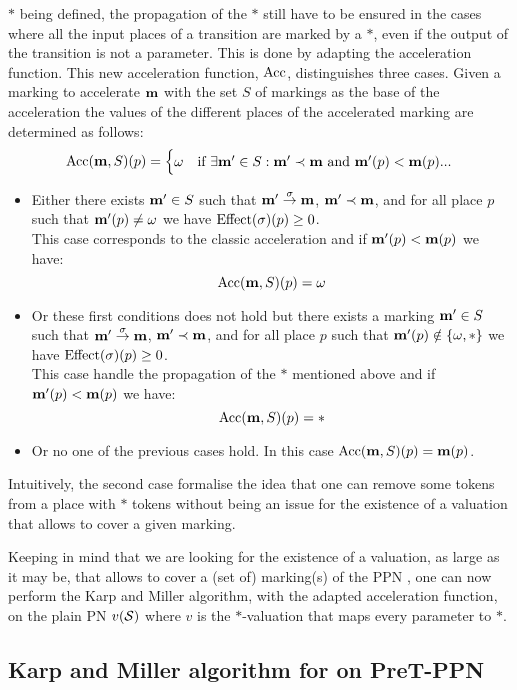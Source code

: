 $*$ being defined, the propagation of the $*$ still have to be ensured in the cases where all the input places of a transition are marked by a $*$, even if the output of the transition is not a parameter.
This is done by adapting the acceleration function.
This new acceleration function, $\operatorname{Acc}$, distinguishes three cases.
Given a marking to accelerate $\mathbf{m}$ with the set $S$ of markings as the base of the acceleration
the values of the different places of the accelerated marking are determined as follows:
\[
  \operatorname{Acc}(\mathbf{m}, S)(p) =
  \begin{cases}
    \omega & \text{if } \exists \mathbf{m'} \in S : \mathbf{m'} \prec \mathbf{m} \text{ and } \mathbf{m'}(p) < \mathbf{m}(p)
    ...
  \end{cases}
\]
\begin{itemize}
  \item Either there exists $\mathbf{m'} \in S$ such that $\mathbf{m'} \stackrel{\sigma}{\to} \mathbf{m}$, $\mathbf{m'} \prec \mathbf{m}$, and for all place $p$ such that $\mathbf{m'}(p) \neq \omega$ we have $\operatorname{Effect}(\sigma)(p) \geq 0$.\\
    This case corresponds to the classic acceleration and
    if $\mathbf{m'}(p) < \mathbf{m}(p)$
    we have:
    \[
      \operatorname{Acc}(\mathbf{m}, S)(p) = \omega
    \]
  \item Or these first conditions does not hold but there exists a marking $\mathbf{m'} \in S$ such that $\mathbf{m'} \stackrel{\sigma}{\to} \mathbf{m}$, $\mathbf{m'} \prec \mathbf{m}$, and for all place $p$ such that $\mathbf{m'}(p) \notin \{\omega, *\}$ we have $\operatorname{Effect}(\sigma)(p) \geq 0$.\\
    This case handle the propagation of the $*$ mentioned above and
    if $\mathbf{m'}(p) < \mathbf{m}(p)$
    we have:
    \[
      \operatorname{Acc}(\mathbf{m}, S)(p) = *
    \]
  \item Or no one of the previous cases hold.
    In this case $\operatorname{Acc}(\mathbf{m}, S)(p) = \mathbf{m}(p)$.
\end{itemize}

Intuitively, the second case formalise the idea that one can remove some tokens from a place with $*$ tokens without being an issue for the existence of a valuation that allows to cover a given marking.

Keeping in mind that we are looking for the existence of a valuation, as large as it may be, that allows to cover a (set of) marking(s) of the \ac{PPN} \PPN, one can now perform the Karp and Miller algorithm, with the adapted acceleration function, on the plain \ac{PN} $v(\mathcal{S})$ where $v$ is the $*$-valuation that maps every parameter to $*$.

\subsection{Karp and Miller algorithm for \Ucov on PreT-\ac{PPN}}

